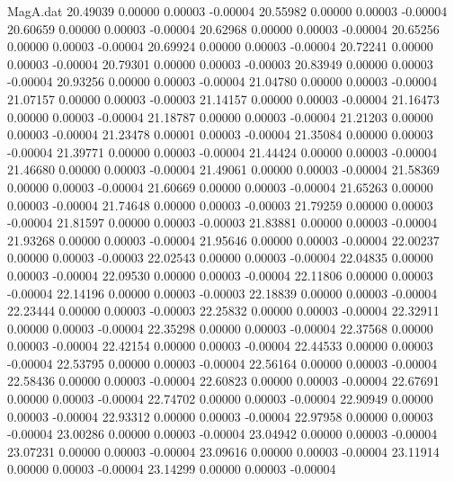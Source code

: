\begin{filecontents}{MagA.dat}
  20.49039    0.00000    0.00003   -0.00004
  20.55982    0.00000    0.00003   -0.00004
  20.60659    0.00000    0.00003   -0.00004
  20.62968    0.00000    0.00003   -0.00004
  20.65256    0.00000    0.00003   -0.00004
  20.69924    0.00000    0.00003   -0.00004
  20.72241    0.00000    0.00003   -0.00004
  20.79301    0.00000    0.00003   -0.00003
  20.83949    0.00000    0.00003   -0.00004
  20.93256    0.00000    0.00003   -0.00004
  21.04780    0.00000    0.00003   -0.00004
  21.07157    0.00000    0.00003   -0.00003
  21.14157    0.00000    0.00003   -0.00004
  21.16473    0.00000    0.00003   -0.00004
  21.18787    0.00000    0.00003   -0.00004
  21.21203    0.00000    0.00003   -0.00004
  21.23478    0.00001    0.00003   -0.00004
  21.35084    0.00000    0.00003   -0.00004
  21.39771    0.00000    0.00003   -0.00004
  21.44424    0.00000    0.00003   -0.00004
  21.46680    0.00000    0.00003   -0.00004
  21.49061    0.00000    0.00003   -0.00004
  21.58369    0.00000    0.00003   -0.00004
  21.60669    0.00000    0.00003   -0.00004
  21.65263    0.00000    0.00003   -0.00004
  21.74648    0.00000    0.00003   -0.00003
  21.79259    0.00000    0.00003   -0.00004
  21.81597    0.00000    0.00003   -0.00003
  21.83881    0.00000    0.00003   -0.00004
  21.93268    0.00000    0.00003   -0.00004
  21.95646    0.00000    0.00003   -0.00004
  22.00237    0.00000    0.00003   -0.00003
  22.02543    0.00000    0.00003   -0.00004
  22.04835    0.00000    0.00003   -0.00004
  22.09530    0.00000    0.00003   -0.00004
  22.11806    0.00000    0.00003   -0.00004
  22.14196    0.00000    0.00003   -0.00003
  22.18839    0.00000    0.00003   -0.00004
  22.23444    0.00000    0.00003   -0.00003
  22.25832    0.00000    0.00003   -0.00004
  22.32911    0.00000    0.00003   -0.00004
  22.35298    0.00000    0.00003   -0.00004
  22.37568    0.00000    0.00003   -0.00004
  22.42154    0.00000    0.00003   -0.00004
  22.44533    0.00000    0.00003   -0.00004
  22.53795    0.00000    0.00003   -0.00004
  22.56164    0.00000    0.00003   -0.00004
  22.58436    0.00000    0.00003   -0.00004
  22.60823    0.00000    0.00003   -0.00004
  22.67691    0.00000    0.00003   -0.00004
  22.74702    0.00000    0.00003   -0.00004
  22.90949    0.00000    0.00003   -0.00004
  22.93312    0.00000    0.00003   -0.00004
  22.97958    0.00000    0.00003   -0.00004
  23.00286    0.00000    0.00003   -0.00004
  23.04942    0.00000    0.00003   -0.00004
  23.07231    0.00000    0.00003   -0.00004
  23.09616    0.00000    0.00003   -0.00004
  23.11914    0.00000    0.00003   -0.00004
  23.14299    0.00000    0.00003   -0.00004

\end{filecontents}

